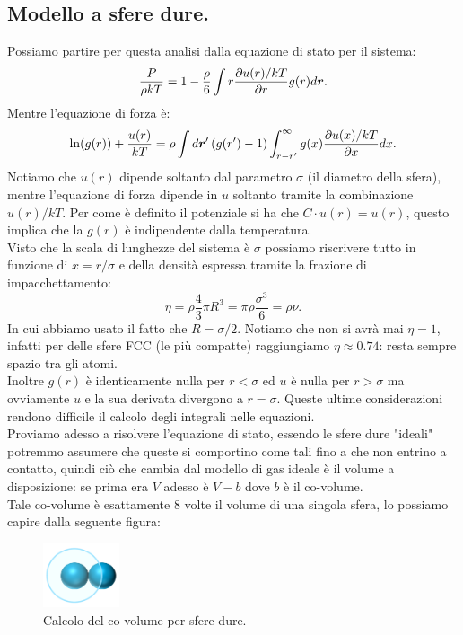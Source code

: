 \subsection{Modello a sfere dure.}
\label{subsec:Modello a sfere dure.}
Possiamo partire per questa analisi dalla equazione di stato per il sistema:
\[
	\frac{P}{\rho kT} 
	=
	1-\frac{\rho }{6}\int r \frac{\partial u(r)/kT}{\partial r} g(r) d \boldsymbol{r}
.\] 
Mentre l'equazione di forza è:
\[
	\ln(g(r))+\frac{u(r)}{kT}
	=
	\rho \int d \boldsymbol{r}'\left( g(r')-1 \right) 
	\int_{r-r'}^{\infty} g(x)\frac{\partial u(x)/kT}{\partial x} dx
.\] 
Notiamo che $u(r)$ dipende soltanto dal parametro $\sigma$ (il diametro della sfera), mentre l'equazione di forza dipende in $u$ soltanto tramite la combinazione $u(r)/kT$. Per come è definito il potenziale si ha che $C\cdot u(r) = u(r)$, questo implica che la $g(r)$ è indipendente dalla temperatura.\\
Visto che la scala di lunghezze del sistema è $\sigma$ possiamo riscrivere tutto in funzione di $x = r/\sigma$ e della densità espressa tramite la frazione di impacchettamento:
\[
	\eta = \rho \frac{4}{3}\pi R^3 = \pi\rho \frac{\sigma^3}{6} = \rho \nu
.\] 
In cui abbiamo usato il fatto che $R=\sigma /2$. Notiamo che non si avrà mai $\eta=1$, infatti per delle sfere FCC (le più compatte) raggiungiamo $\eta \approx 0.74$: resta sempre spazio tra gli atomi.\\
Inoltre $g(r)$ è identicamente nulla per $r<\sigma$ ed $u$ è nulla per $r>\sigma$ ma ovviamente $u$ e la sua derivata divergono a $r=\sigma$. Queste ultime considerazioni rendono difficile il calcolo degli integrali nelle equazioni.\\
Proviamo adesso a risolvere l'equazione di stato, essendo le sfere dure "ideali" potremmo assumere che queste si comportino come tali fino a che non entrino a contatto, quindi ciò che cambia dal modello di gas ideale è il volume a disposizione: se prima era $V$ adesso è $V-b$ dove $b$ è il co-volume. \\
Tale co-volume è esattamente 8 volte il volume di una singola sfera, lo possiamo capire dalla seguente figura:
\begin{figure}[H]
	\centering
	\includegraphics[width=0.2\textwidth]{figures/coovolume.png}
	\caption{Calcolo del co-volume per sfere dure.}
	\label{fig:figures-coovolume-png}
\end{figure}
